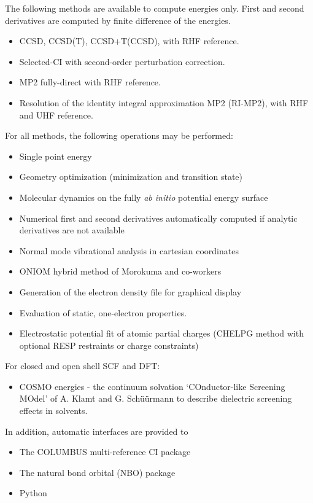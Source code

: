 The following methods are available to compute energies only.  First
and second derivatives are computed by finite difference of the
energies.
\begin{itemize}
\item CCSD, CCSD(T), CCSD+T(CCSD), with RHF reference.
\item Selected-CI with second-order perturbation correction.
\item MP2 fully-direct with RHF reference.
\item Resolution of the identity integral approximation MP2 (RI-MP2), with
  RHF and UHF reference.
\end{itemize}

For all methods, the following operations may be performed:
\begin{itemize}
\item Single point energy
\item Geometry optimization (minimization and transition state)
\item Molecular dynamics on the fully {\em ab initio} potential energy
  surface
\item Numerical first and second derivatives automatically computed if
  analytic derivatives are not available
\item Normal mode vibrational analysis in cartesian coordinates
\item ONIOM hybrid method of Morokuma and co-workers
\item Generation of the electron density file for graphical display
\item Evaluation of static, one-electron properties.
\item Electrostatic potential fit of atomic partial charges (CHELPG method with
    optional RESP restraints or charge constraints)
\end{itemize}

For closed and open shell SCF and DFT:
\begin{itemize}
\item COSMO energies - the continuum solvation `COnductor-like Screening MOdel'
    of A. Klamt and G. Sch\"{u}\"{u}rmann to describe dielectric screening effects in
    solvents.
\end{itemize}

In addition, automatic interfaces are provided to
\begin{itemize}
\item The COLUMBUS multi-reference CI package
\item The natural bond orbital (NBO) package
\item Python
\end{itemize}

